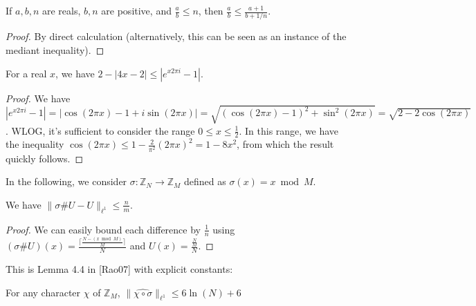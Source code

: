 \begin{lemma}
    \label{le_add_div_add_of_le_of_le}
    \leanok
    If $a, b, n$ are reals, $b, n$ are positive, and $\frac ab \leq n$, then $\frac ab \leq \frac{a+1}{b + 1/n}$.
\end{lemma}

\begin{proof}
    \leanok
    By direct calculation (alternatively, this can be seen as an instance of the mediant inequality).
\end{proof}

\begin{lemma}
    \label{circle_lower_bound}
    \leanok
    For a real $x$, we have $2 - |4x - 2| \leq |e^{x 2\pi i} - 1|$.
\end{lemma}

\begin{proof}
    \leanok
    We have $|e^{x 2\pi i} - 1| = |\cos(2 \pi x) - 1 + i \sin(2 \pi x)| =
    \sqrt{(\cos(2 \pi x) - 1)^2 + \sin^2(2 \pi x)} = \sqrt{2 - 2\cos(2\pi x)}$.
    WLOG, it's sufficient to consider the range $0 \leq x \leq \frac12$.
    In this range, we have the inequality $\cos(2 \pi x) \leq 1 - \frac{2}{\pi^2} (2 \pi x)^2 = 1 - 8 x^2$,
    from which the result quickly follows.
\end{proof}

In the following, we consider $\sigma: \mathbb{Z}_N \to \mathbb{Z}_M$ defined as $\sigma(x) = x \bmod M$.

\begin{lemma}
    \label{bound_on_apply_uniform}
    \leanok
    We have $\lVert \sigma \# U - U \rVert_{\ell^1} \leq \frac nm$.
\end{lemma}

\begin{proof}
    \leanok
    We can easily bound each difference by $\frac1n$ using $(\sigma \# U)(x) = \frac{\lceil \frac{N - (x \bmod M)}{M} \rceil}N$ and $U(x) = \frac{\frac NM}N$.
\end{proof}

\begin{theorem}
    \label{lemma44}
    \leanok
    This is Lemma 4.4 in [Rao07] with explicit constants:

    For any character $\chi$ of $\mathbb{Z}_M$, $\lVert \widehat{\chi \circ \sigma}\rVert_{\ell^1} \leq 6 \ln(N) + 6$
\end{theorem}


